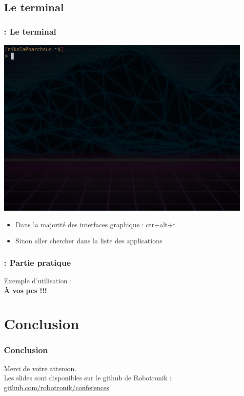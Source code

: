 \documentclass[13pt]{beamer}
\newenvironment{slide}[1]{
  \begin{frame}[environment=slide]
    \frametitle{\textbf{\insertsection}  : #1}}
{\end{frame}}
\begin{document}
\subsection{Le terminal}
\begin{slide}{Le terminal}
  \begin{center}
    \includegraphics[scale=0.4]{Images/terminal.png}
  \end{center}
  \begin{itemize}
  \item Dans la majorité des interfaces graphique : ctr+alt+t
  \item Sinon aller chercher dans la liste des applications
  \end{itemize}
\end{slide}

\begin{slide}{Partie pratique}
  \begin{center}
    \LARGE{Exemple d'utilisation :\\
      \textbf{À vos pcs !!!}}
  \end{center}
\end{slide}


\section{Conclusion}

\begin{frame}
  \frametitle{\textbf{Conclusion}}
  Merci de votre attenion.\\
  \vspace*{1cm}
  Les slides sont disponibles sur le github de Robotronik : \url{github.com/robotronik/conferences}
\end{frame}
\end{document}
